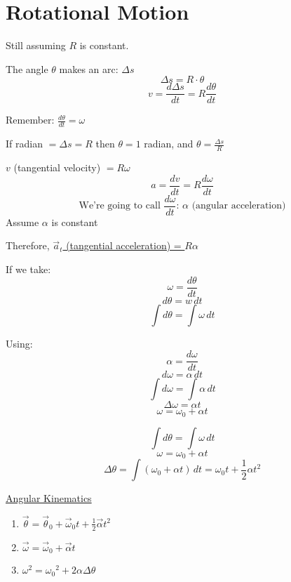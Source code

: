 \documentclass[fleqn]{article}
\begin{document}
\setlength{\mathindent}{0pt}
\section*{Rotational Motion}
Still assuming $R$ is constant.

The angle $\theta$ makes an arc: $\Delta s$
\[ \Delta s=R \cdot \theta \]
\[ v = \frac{d \Delta s}{dt} = R \frac{d \theta}{dt} \]

Remember: $\frac{d \theta}{dt} = \omega$

If radian $= \Delta s = R$ then $\theta = 1$ radian, and $\theta = \frac{\Delta s}{R} $

$v$ (tangential velocity) $= R \omega$
\[ a = \frac{dv}{dt} = R \frac{d \omega}{dt}  \]
\[ \text{We're going to call } \frac{d \omega}{dt}\text{: } \alpha \text{ (angular acceleration)}  \]
Assume $\alpha$ is constant

Therefore, \underline{$\vec{a}_{t}$ (tangential acceleration) = $R \alpha$}

If we take:
\[ \omega = \frac{d \theta}{dt}  \]
\[ d \theta = w\, dt \]
\[ \int d \theta  = \int \omega\, dt\]

Using:
\[ \alpha = \frac{d \omega}{dt} \]
\[ d \omega = \alpha \, dt \]
\[ \int d \omega = \int \alpha \, dt \]
\[ \Delta \omega = \alpha t \]
\[ \omega = \omega _{0} + \alpha t  \]

\[ \int d \theta  = \int \omega\, dt\]
\[ \omega = \omega _{0} + \alpha t  \]
\[ \Delta \theta = \int \left( \omega _{0} + \alpha t  \right)\, dt
	= \omega _{0}t + \frac{1}{2} \alpha t^2
\]

\underline{Angular Kinematics}
\begin{enumerate}
	\item $\vec{\theta} = \vec{\theta }_{0} + \vec{\omega }_{0}t + \frac{1}{2} \vec{\alpha }t^2    $
	\item $\vec{\omega } = \vec{\omega} _{0} + \vec{\alpha}t    $
	\item $\omega ^2 = {\omega _{0}}^2 + 2 \alpha \Delta \theta $
\end{enumerate}
\end{document}
